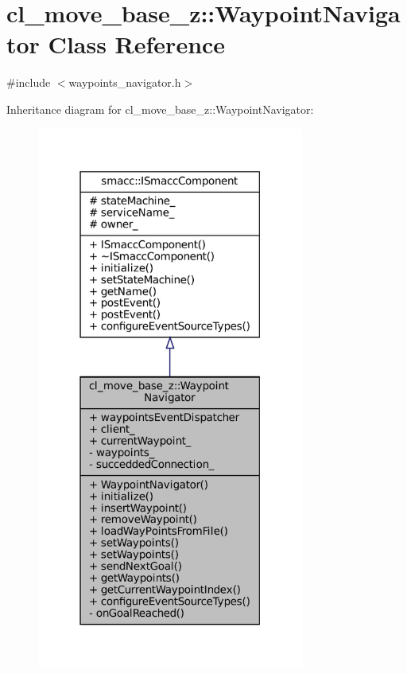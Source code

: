 \hypertarget{classcl__move__base__z_1_1WaypointNavigator}{}\section{cl\+\_\+move\+\_\+base\+\_\+z\+:\+:Waypoint\+Navigator Class Reference}
\label{classcl__move__base__z_1_1WaypointNavigator}


{\ttfamily \#include $<$waypoints\+\_\+navigator.\+h$>$}



Inheritance diagram for cl\+\_\+move\+\_\+base\+\_\+z\+:\+:Waypoint\+Navigator\+:
\nopagebreak
\begin{figure}[H]
\begin{center}
\leavevmode
\includegraphics[width=249pt]{classcl__move__base__z_1_1WaypointNavigator__inherit__graph}
\end{center}
\end{figure}


